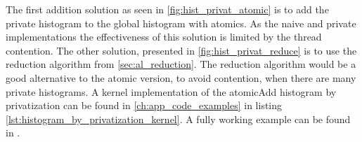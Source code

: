 The first addition solution as seen in \cref{fig:hist_privat_atomic} is to add the private histogram to the global histogram with atomics. As the naive and private  implementations the effectiveness of this solution is limited by the thread contention. The other solution, presented in \cref{fig:hist_privat_reduce} is to use the reduction algorithm from \cref{sec:al_reduction}. The reduction algorithm would be a good alternative to the atomic version, to avoid contention,  when there are many private histograms. A kernel implementation of the atomicAdd histogram by privatization can be found in \cref{ch:app_code_examples} in listing \ref{lst:histogram_by_privatization_kernel}. A fully working example can be found in \cite{exercises}.       